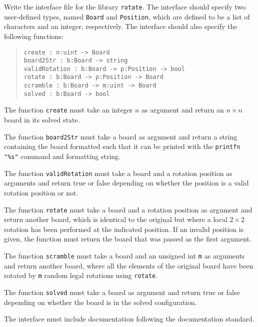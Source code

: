 Write the interface file for the library \lstinline{rotate}. The interface should specify two user-defined types, named \lstinline{Board} and \lstinline{Position}, which are defined to be a list of characters and an integer, respectively. The interface should also specify the following functions:
\begin{quote}
  \lstinline{create : n:uint -> Board}
  \\\lstinline{board2Str : b:Board -> string}
  \\\lstinline{validRotation : b:Board -> p:Position -> bool}
  \\\lstinline{rotate : b:Board -> p:Position -> Board}
  \\\lstinline{scramble : b:Board -> m:uint -> Board}
  \\\lstinline{solved : b:Board -> bool}
\end{quote}
The function \lstinline{create} must take an integer $n$ as argument and return an $n\times n$ board in its solved state.

The function \lstinline{board2Str} must take a board as argument and return a string containing the board formatted such that it can be printed with the \lstinline{printfn "%s"} command and formatting string.

The function \lstinline{validRotation} must take a board and a rotation position as arguments and return true or false depending on whether the position is a valid rotation position or not.

The function \lstinline{rotate} must take a board and a rotation position as argument and return another board, which is identical to the original but where a local $2\times 2$ rotation has been performed at the indicated position. If an invalid position is given, the function must return the board that was passed as the first argument.

The function \lstinline{scramble} must take a board and an unsigned int \lstinline{m} as arguments and return another board, where all the elements of the original board have been rotated by \lstinline{m} random legal rotations using \lstinline{rotate}.

The function \lstinline{solved} must take a board as argument and return true or false depending on whether the board is in the solved configuration.

The interface must include documentation following the documentation standard.
